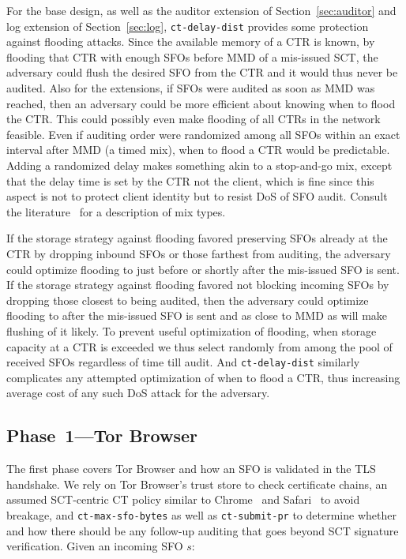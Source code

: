 For the base design, as well as the auditor extension of
Section~\ref{sec:auditor} and log extension of Section~\ref{sec:log},
\texttt{ct-delay-dist} provides some protection against flooding
attacks. Since the available memory of a CTR is known, by flooding
that CTR with enough SFOs before MMD of a mis-issued SCT, the
adversary could flush the desired SFO from the CTR and it would thus
never be audited.  Also for the extensions, if SFOs were audited as
soon as MMD was reached, then an adversary could be more efficient
about knowing when to flood the CTR\@. This could possibly even make
flooding of all CTRs in the network feasible. Even if auditing order
were randomized among all SFOs within an exact interval after MMD (a
timed mix), when to flood a CTR would be predictable. Adding a
randomized delay makes something akin to a stop-and-go mix, except
that the delay time is set by the CTR not the client, which is fine
since this aspect is not to protect client identity but to resist DoS
of SFO audit. Consult the literature~\cite{trickle02} for a description
of mix types.

If the storage strategy against flooding favored preserving SFOs
already at the CTR by dropping inbound SFOs or those farthest from
auditing, the adversary could optimize flooding to just before or
shortly after the mis-issued SFO is sent. If the storage strategy
against flooding favored not blocking incoming SFOs by dropping those
closest to being audited, then the adversary could optimize flooding
to after the mis-issued SFO is sent and as close to MMD as will make
flushing of it likely. To prevent useful optimization of flooding,
when storage capacity at a CTR is exceeded we thus select randomly
from among the pool of received SFOs regardless of time till audit.
And \texttt{ct-delay-dist} similarly complicates any attempted
optimization of when to flood a CTR, thus increasing average cost
of any such DoS attack for the adversary.


\subsection{Phase~1---Tor Browser} \label{sec:base:phase1}
The first phase covers Tor Browser and how an SFO is validated in the TLS
handshake.  We rely on Tor Browser's trust store to check certificate chains, an
assumed SCT-centric CT policy similar to Chrome~\cite{chrome-policy} and
Safari~\cite{safari-policy} to avoid breakage, and \texttt{ct-max-sfo-bytes} as
well as \texttt{ct-submit-pr} to determine whether and how there should be any
follow-up auditing that goes beyond SCT signature verification.  Given an
incoming SFO $s$:

